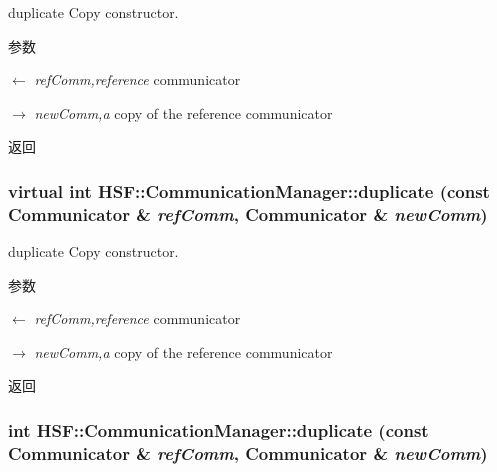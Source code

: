duplicate Copy constructor. 
\begin{DoxyParams}{参数}
\item[\mbox{$\leftarrow$} {\em refComm,reference}]communicator \item[\mbox{$\rightarrow$} {\em newComm,a}]copy of the reference communicator \end{DoxyParams}
\begin{DoxyReturn}{返回}

\end{DoxyReturn}
\hypertarget{classHSF_1_1CommunicationManager_aa506879f09f9f0d3853a38bd5957024d}{
\subsubsection[{duplicate}]{\setlength{\rightskip}{0pt plus 5cm}virtual int HSF::CommunicationManager::duplicate (const {\bf Communicator} \& {\em refComm}, \/  {\bf Communicator} \& {\em newComm})}}
\label{classHSF_1_1CommunicationManager_aa506879f09f9f0d3853a38bd5957024d}


duplicate Copy constructor. 
\begin{DoxyParams}{参数}
\item[\mbox{$\leftarrow$} {\em refComm,reference}]communicator \item[\mbox{$\rightarrow$} {\em newComm,a}]copy of the reference communicator \end{DoxyParams}
\begin{DoxyReturn}{返回}

\end{DoxyReturn}
\hypertarget{classHSF_1_1CommunicationManager_aa2afb95a55e1e33429cbb118b0abadf3}{
\subsubsection[{duplicate}]{\setlength{\rightskip}{0pt plus 5cm}int HSF::CommunicationManager::duplicate (const {\bf Communicator} \& {\em refComm}, \/  {\bf Communicator} \& {\em newComm})}}
\label{classHSF_1_1CommunicationManager_aa2afb95a55e1e33429cbb118b0abadf3}


